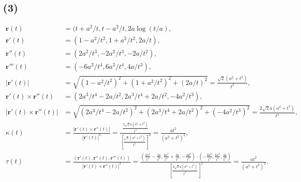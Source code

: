 \documentclass[11pt,a4paper]{article}
\begin{document}
\subsection*{(3)}
\begin{align*}
  \mathbf{r}(t)                         & =(t+a^2/t,t-a^2/t,2a\log(t/a),               \\
  \mathbf{r}'(t)                        & =(1-a^2/t^2,1+a^2/t^2,2a/t),                 \\
  \mathbf{r}''(t)                       & =(2a^2/t^3,-2a^2/t^3,-2a/t^2),               \\
  \mathbf{r}'''(t)                      & =(-6a^2/t^4,6a^2/t^4,4a/t^3),                \\
  |\mathbf{r}'(t)|                      & =\sqrt{(1-a^2/t^2)^2+(1+a^2/t^2)^2+(2a/t)^2}
  =\frac{\sqrt{2}(a^2+t^2)}{t^2},                                                      \\
  \mathbf{r}'(t)\times\mathbf{r}''(t)   &
  =(2a^3/t^4-2a/t^2,2a^3/t^4+2a/t^2,-4a^2/t^3),                                        \\
  |\mathbf{r}'(t)\times\mathbf{r}''(t)| &
  =\sqrt{(2a^3/t^4-2a/t^2)^2+(2a^3/t^4+2a/t^2)^2+(-4a^2/t^3)^2}
  =\frac{2\sqrt{2}a(a^2+t^2)}{t^4},                                                    \\
  \kappa(t)                             &
  =\frac{|\mathbf{r}'(t)\times\mathbf{r}''(t)|}{|\mathbf{r}'(t)|^3}
  =\frac{\frac{2\sqrt{2}a(a^2+t^2)}{t^4}}{[\frac{\sqrt{2}(a^2+t^2)}{t^2}]^3}
  =\frac{at^2}{(a^2+t^2)^2},                                                           \\
  \tau(t)                               &
  =\frac{(\mathbf{r}'(t),\mathbf{r}''(t),\mathbf{r}'''(t))}{|\mathbf{r}'(t)\times\mathbf{r}''(t)|^2}=\frac{(\frac{2a^3}{t^4}-\frac{2a}{t^2},\frac{2a^3}{t^4}+\frac{2a}{t^2},-\frac{4a^2}{t^3})\cdot(-\frac{6a^2}{t^4},\frac{6a^2}{t^4},\frac{4a}{t^3})}{[\frac{2\sqrt{2}a(a^2+t^2)}{t^4}]^2}=\frac{at^2}{(a^2+t^2)^2}.
\end{align*}
\end{document}
